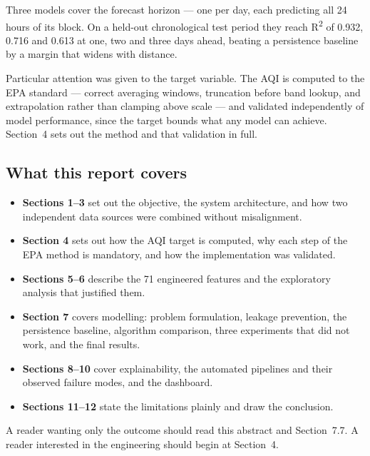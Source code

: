 \documentclass[11pt,a4paper]{article}
\begin{document}
Three models cover the forecast horizon --- one per day, each predicting
all 24 hours of its block. On a held-out chronological test period they
reach R\textsuperscript{2} of 0.932, 0.716 and 0.613 at one, two and
three days ahead, beating a persistence baseline by a margin that widens
with distance.

Particular attention was given to the target variable. The AQI is
computed to the EPA standard --- correct averaging windows, truncation
before band lookup, and extrapolation rather than clamping above scale
--- and validated independently of model performance, since the target
bounds what any model can achieve. Section~4 sets out the method and
that validation in full.

\subsection*{What this report covers}

\begin{itemize}
  \item \textbf{Sections 1--3} set out the objective, the system
        architecture, and how two independent data sources were combined
        without misalignment.
  \item \textbf{Section 4} sets out how the AQI target is computed, why
        each step of the EPA method is mandatory, and how the
        implementation was validated.
  \item \textbf{Sections 5--6} describe the 71 engineered features and
        the exploratory analysis that justified them.
  \item \textbf{Section 7} covers modelling: problem formulation,
        leakage prevention, the persistence baseline, algorithm
        comparison, three experiments that did not work, and the final
        results.
  \item \textbf{Sections 8--10} cover explainability, the automated
        pipelines and their observed failure modes, and the dashboard.
  \item \textbf{Sections 11--12} state the limitations plainly and draw
        the conclusion.
\end{itemize}

A reader wanting only the outcome should read this abstract and
Section~7.7. A reader interested in the engineering should begin at
Section~4.

\newpage

{\setlength{\parskip}{0pt}\tableofcontents}
\newpage
\end{document}
